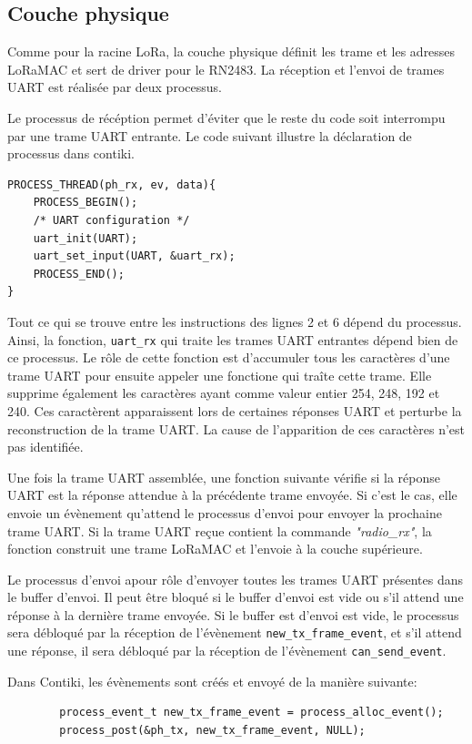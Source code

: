 \subsection*{Couche physique}
    Comme pour la racine LoRa, la couche physique définit les trame et les adresses LoRaMAC et sert de driver pour le RN2483. La réception et l'envoi de trames UART est réalisée par deux processus.

    Le processus de récéption permet d'éviter que le reste du code soit interrompu par une trame UART entrante. Le code suivant illustre la déclaration de processus dans contiki.  

    \begin{verbatim}
PROCESS_THREAD(ph_rx, ev, data){
    PROCESS_BEGIN();
    /* UART configuration */
    uart_init(UART);
    uart_set_input(UART, &uart_rx);
    PROCESS_END();
}
    \end{verbatim}
    Tout ce qui se trouve entre les instructions des lignes 2 et 6 dépend du processus. Ainsi, la fonction, \texttt{uart\_rx} qui traite les trames UART entrantes dépend bien de ce processus.
    Le rôle de cette fonction est d'accumuler tous les caractères d'une trame UART pour ensuite appeler une fonctione qui traîte cette trame. Elle supprime également les caractères ayant comme valeur entier 254, 248, 192 et 240. Ces caractèrent apparaissent lors de certaines réponses UART et perturbe la reconstruction de la trame UART. La cause de l'apparition de ces caractères n'est pas identifiée.

    Une fois la trame UART assemblée, une fonction suivante vérifie si la réponse UART est la réponse attendue à la précédente trame envoyée. Si c'est le cas, elle envoie un évènement qu'attend le processus d'envoi pour envoyer la prochaine trame UART. Si la trame UART reçue contient la commande \textit{"radio\_rx"}, la fonction construit une trame LoRaMAC et l'envoie à la couche supérieure.

    Le processus d'envoi apour rôle d'envoyer toutes les trames UART présentes dans le buffer 
    d'envoi. Il peut être bloqué si le buffer d'envoi est vide ou s'il attend une réponse à la 
    dernière trame envoyée. Si le buffer est d'envoi est vide, le processus sera débloqué par la 
    réception de l'évènement \texttt{new\_tx\_frame\_event}, et s'il attend une réponse, il sera 
    débloqué par la réception de l'évènement \texttt{can\_send\_event}.

    Dans Contiki, les évènements sont créés et envoyé de la manière suivante:
    \begin{verbatim}
        process_event_t new_tx_frame_event = process_alloc_event();
        process_post(&ph_tx, new_tx_frame_event, NULL);
    \end{verbatim}
    
